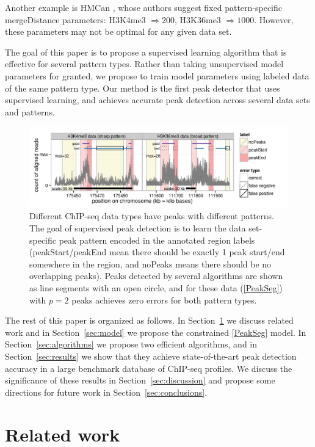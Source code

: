 \documentclass{article}
\begin{document}
Another example is HMCan \citep{HMCan}, whose authors suggest fixed
pattern-specific mergeDistance parameters: H3K4me3 $\Rightarrow 200$,
H3K36me3 $\Rightarrow 1000$. However, these parameters may not be
optimal for any given data set.

The goal of this paper is to propose a supervised learning algorithm
that is effective for several pattern types. Rather than taking
unsupervised model parameters for granted, we propose to train model
parameters using labeled data of the same pattern type. Our method is
the first peak detector that uses supervised learning, and achieves
accurate peak detection across several data sets and patterns.

\begin{figure}[b!]
  \centering
  \includegraphics[width=\textwidth]{figure-dp-peaks-train}
  \vskip -0.5cm
  \caption{Different ChIP-seq data types have peaks with different
    patterns. The goal of supervised peak detection is to learn the
    data set-specific peak pattern encoded in the annotated region
    labels (peakStart/peakEnd mean there should be exactly 1 peak
    start/end somewhere in the region, and noPeaks means there should
    be no overlapping peaks). Peaks detected by several algorithms are
    shown as line segments with an open circle, and for these data
    (\ref{PeakSeg}) with $p=2$ peaks achieves zero errors for both
    pattern types.}
  \label{fig:dp-peaks-train}
\end{figure}

The rest of this paper is organized as follows. In
Section~\ref{sec:related} we discuss related work and in
Section~\ref{sec:model} we propose the constrained \ref{PeakSeg}
model. In Section~\ref{sec:algorithms} we propose two efficient
algorithms, and in Section~\ref{sec:results} we show that they achieve
state-of-the-art peak detection accuracy in a large benchmark database
of ChIP-seq profiles. We discuss the significance of these results in
Section~\ref{sec:discussion} and propose some directions for future
work in Section~\ref{sec:conclusions}.

\section{Related work}
\label{sec:related}
\end{document}
